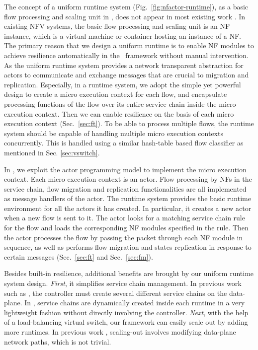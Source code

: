 The concept of a uniform runtime system (Fig.~\ref{fig:nfactor-runtime}), as a basic flow processing and scaling unit in \nfactor, does not appear in most existing work \cite{bremler2015openbox, gember2012stratos, palkar2015e2}. In existing NFV systems, the basic flow processing and scaling unit is an NF instance, which is a virtual machine or container hosting an instance of a NF. %
 The primary reason that we design a uniform runtime is to enable NF modules to achieve resilience automatically in the \nfactor~framework without manual intervention. As the uniform runtime system provides a network transparent abstraction for actors to communicate and exchange messages that are crucial to migration and replication. %
  Especially, in a runtime system, we adopt the simple yet powerful design to create a micro execution context for each flow, and encapsulate processing functions of the flow over its entire service chain inside the micro execution context. Then we can enable resilience on the basis of each micro execution context (Sec.~\ref{sec:ft}). To be able to process multiple flows, the runtime system should be capable of handling multiple micro execution contexts concurrently. This is handled using a similar hash-table based flow classifier as mentioned in Sec. \ref{sec:vswitch}.

In \nfactor, we exploit the actor programming model to implement the micro execution context. Each micro execution context is an actor. Flow processing by NFs in the service chain, flow migration and replication functionalities are all implemented as message handlers of the actor. The runtime system provides the basic runtime environment for all the actors it has created. In particular, it creates a new actor when a new flow is sent to it. The actor looks for a matching service chain rule for the flow and loads the corresponding NF modules specified in the rule. Then the actor processes the flow by passing the packet through each NF module in sequence, as well as performs flow migration and states replication in response to certain messages (Sec.~\ref{sec:ft} and Sec.~\ref{sec:fm}). 

Besides built-in resilience, additional benefits are brought by our uniform runtime system design. \textit{First}, it simplifies service chain management. In previous work such as \cite{palkar2015e2}, the controller must create several different service chains on the data-plane. %
 In \nfactor, service chains are dynamically created inside each runtime in a very lightweight fashion without directly involving the controller. \textit{Next}, with the help of a load-balancing virtual switch, our framework can easily scale out by adding more runtimes. In previous work \cite{palkar2015e2}, scaling-out involves modifying data-plane network paths, which is not trivial.

